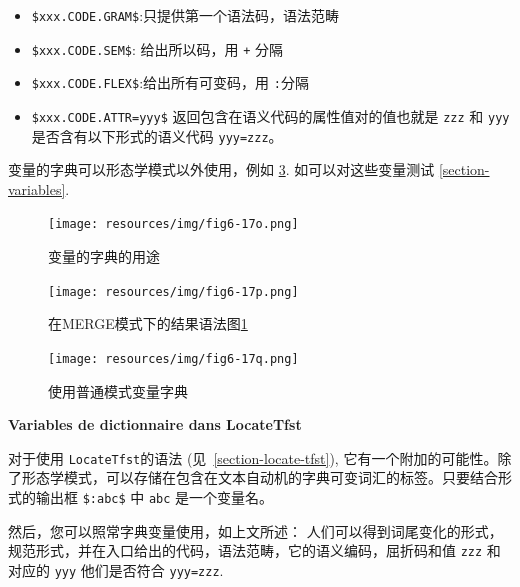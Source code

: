\begin{itemize}
\item \verb+$xxx.CODE.GRAM$+:只提供第一个语法码，语法范畴
  
\item \verb+$xxx.CODE.SEM$+: 给出所以码，用 \verb$+$ 分隔
  
\item \verb+$xxx.CODE.FLEX$+:给出所有可变码，用 \verb$:$分隔

\item \verb+$xxx.CODE.ATTR=yyy$+ 返回包含在语义代码的属性值对的值也就是 \verb+zzz+ 和 \verb+yyy+ 是否含有以下形式的语义代码 \verb+yyy=zzz+。

\end{itemize}
	
\noindent 变量的字典可以形态学模式以外使用，例如
 \ref{fig-morpho7}. 如可以对这些变量测试 \ref{section-variables}.

\begin{figure}[!ht]
\begin{center}
\texttt{[image: resources/img/fig6-17o.png]}
\caption{变量的字典的用途\label{fig-morpho5}}
\end{center}
\end{figure}

\begin{figure}[!ht]
\begin{center}
\texttt{[image: resources/img/fig6-17p.png]}
\caption{在MERGE模式下的结果语法图\ref{fig-morpho5} 
\label{fig-morpho6}}
\end{center}
\end{figure}

\begin{figure}[!ht]
\begin{center}
\texttt{[image: resources/img/fig6-17q.png]}
\caption{使用普通模式变量字典\label{fig-morpho7}}
\end{center}
\end{figure}


\bigskip
\noindent \textbf{Variables de dictionnaire dans LocateTfst}

\noindent 对于使用 \verb+LocateTfst+的语法 (见~\ref{section-locate-tfst}), 
它有一个附加的可能性。除了形态学模式，可以存储在包含在文本自动机的字典可变词汇的标签。只要结合形式的输出框 \verb+$:abc$+ 中 \verb+abc+
是一个变量名。

然后，您可以照常字典变量使用，如上文所述：
人们可以得到词尾变化的形式，规范形式，并在入口给出的代码，语法范畴，它的语义编码，屈折码和值
 \verb+zzz+ 和对应的 \verb+yyy+ 他们是否符合 \verb+yyy=zzz+.


